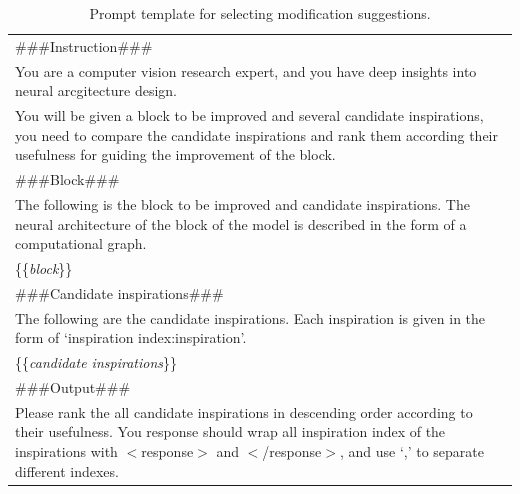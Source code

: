 \begin{table}[htbp]
    \centering
    \caption{Prompt template for selecting modification suggestions.}
    \begin{tabular}{p{}}
        \hline
        \#\#\#Instruction\#\#\#\\
        You are a computer vision research expert, and you have deep insights into neural arcgitecture design.\\
        You will be given a block to be improved and several candidate inspirations, you need to compare the candidate inspirations and rank them according their usefulness for guiding the improvement of the block.\\
        \#\#\#Block\#\#\#\\
        The following is the block to be improved and candidate inspirations. The neural architecture of the block of the model is described in the form of a computational graph.\\
        \{\{\textit{block}\}\}\\
        \#\#\#Candidate inspirations\#\#\#\\
        The following are the candidate inspirations. Each inspiration is given in the form of `inspiration index:inspiration'.\\
        \{\{\textit{candidate inspirations}\}\}\\
        \#\#\#Output\#\#\#\\
        Please rank the all candidate inspirations in descending order according to their usefulness. You response should wrap all inspiration index of the inspirations with $<$response$>$ and $<$/response$>$, and use `,' to separate different indexes.\\
        \hline
    \end{tabular}
    \label{tab:prompt_proposer}
\end{table}

